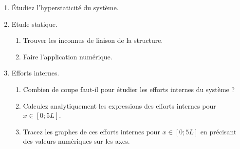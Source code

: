 \documentclass[lecture.tex]{subfiles}
\begin{document}
\begin{enumerate}
  \item Étudiez l’hyperstaticité du système.
  \item Etude statique.
  \begin{enumerate}
  \item Trouver les inconnus de liaison de la structure.
  \item Faire l’application numérique.
  \end{enumerate}
  \item Efforts internes.
  \begin{enumerate}
    \item Combien de coupe faut-il pour étudier les efforts internes du système ?
    \item Calculez analytiquement les expressions des efforts internes pour $x \in[0 ; 5L]$.
    \item Tracez les graphes de ces efforts internes pour $x \in[0 ; 5L]$ en précisant des valeurs numériques sur les axes.
  \end{enumerate}
\end{enumerate}

\finexercice
\end{document}
